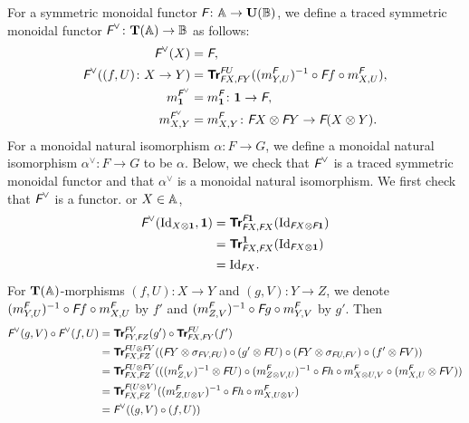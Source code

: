 For a symmetric monoidal functor $\textit{\textsf{F}} \colon \mathbb{A} \to
\mathbf{U}(\mathbb{B})$, we define a traced symmetric monoidal functor
$\textit{\textsf{F}}^{\vee} \colon \mathbf T(\mathbb{A}) \to \mathbb{B}$ as follows:
\begin{align*}
  \textit{\textsf{F}}^{\vee}(X) &= \textit{\textsf{F}}, \\
  \textit{\textsf{F}}^{\vee}((f,U) \colon X \to Y)
  &= {\normalfont\textsf{\textbf{Tr}}}^{\textit{\textsf{F}}U}_{\textit{\textsf{F}}X,\textit{\textsf{F}}Y}((m_{Y,U}^{\textit{\textsf{F}}})^{-1} \circ \textit{\textsf{F}}f
  \circ m^{\textit{\textsf{F}}}_{X,U}), \\
  m^{\textit{\textsf{F}}^{\vee}}_{\mathbf 1} &= m^{\textit{\textsf{F}}}_{\mathbf 1} \colon \mathbf 1 \to \textit{\textsf{F}}, \\
  m^{\textit{\textsf{F}}^{\vee}}_{X,Y} &= m^{\textit{\textsf{F}}}_{X,Y} \colon \textit{\textsf{F}}X \otimes \textit{\textsf{F}}Y
  \to \textit{\textsf{F}}(X \otimes Y).
\end{align*}
For a monoidal natural isomorphism $\alpha \colon F \to G$, we
define a monoidal natural isomorphism $\alpha^{\vee} \colon F \to G$
to be $\alpha$. Below, we check that $\textit{\textsf{F}}^{\vee}$ is a
traced symmetric monoidal functor and that $\alpha^{\vee}$ is a
monoidal natural isomorphism. We first check that $\textit{\textsf{F}}^{\vee}$
is a functor. or $X \in \mathbb{A}$,
\begin{align*}
  \textit{\textsf{F}}^{\vee}(\mbox{Id}_{X \otimes \mathbf 1},\mathbf 1)
  &= {\normalfont\textsf{\textbf{Tr}}}^{\textit{\textsf{F}}\mathbf 1}_{\textit{\textsf{F}}X,\textit{\textsf{F}}X}(\mbox{Id}_{\textit{\textsf{F}}X \otimes \textit{\textsf{F}}\mathbf 1}) \\
  &= {\normalfont\textsf{\textbf{Tr}}}^{\mathbf 1}_{\textit{\textsf{F}}X,\textit{\textsf{F}}X}(\mbox{Id}_{\textit{\textsf{F}}X \otimes \mathbf 1}) \\
  &= \mbox{Id}_{\textit{\textsf{F}}X}.
\end{align*}
For $\mathbf T(\mathbb{A})$-morphisms $(f,U) \colon X \to Y$ and $(g,V)
\colon Y \to Z$, we denote $(m_{Y,U}^{\textit{\textsf{F}}})^{-1} \circ
\textit{\textsf{F}}f \circ m^{\textit{\textsf{F}}}_{X,U}$ by $f'$ and
$(m_{Z,V}^{\textit{\textsf{F}}})^{-1} \circ \textit{\textsf{F}}g \circ
m^{\textit{\textsf{F}}}_{Y,V}$ by $g'$. Then
\begin{align*}
  \textit{\textsf{F}}^{\vee}(g,V) \circ \textit{\textsf{F}}^{\vee}(f,U)
  &= {\normalfont\textsf{\textbf{Tr}}}^{\textit{\textsf{F}}V}_{\textit{\textsf{F}}Y,\textit{\textsf{F}}Z}(g') \circ
  {\normalfont\textsf{\textbf{Tr}}}^{\textit{\textsf{F}}U}_{\textit{\textsf{F}}X,\textit{\textsf{F}}Y}(f') \\
  &= {\normalfont\textsf{\textbf{Tr}}}^{\textit{\textsf{F}}U \otimes \textit{\textsf{F}}V}_{\textit{\textsf{F}}X,\textit{\textsf{F}}Z}
  ((\textit{\textsf{F}}Y \otimes \sigma_{\textit{\textsf{F}}V,\textit{\textsf{F}}U}) \circ
  (g' \otimes \textit{\textsf{F}}U) \circ (\textit{\textsf{F}}Y \otimes \sigma_{\textit{\textsf{F}}U,\textit{\textsf{F}}V}) \circ
  (f' \otimes \textit{\textsf{F}}V)) \\
  &= {\normalfont\textsf{\textbf{Tr}}}^{\textit{\textsf{F}}U \otimes \textit{\textsf{F}}V}_{\textit{\textsf{F}}X,\textit{\textsf{F}}Z}(((m_{Z,V}^{\textit{\textsf{F}}})^{-1}
  \otimes \textit{\textsf{F}}U) \circ
  (m_{Z \otimes V,U}^{\textit{\textsf{F}}})^{-1} \circ
  \textit{\textsf{F}}h \circ m_{X \otimes U,V}^{\textit{\textsf{F}}} \circ (m_{X,U}^{\textit{\textsf{F}}} \otimes \textit{\textsf{F}}V)) \\
  &= {\normalfont\textsf{\textbf{Tr}}}^{\textit{\textsf{F}}(U \otimes V)}_{\textit{\textsf{F}}X,\textit{\textsf{F}}Z}((m_{Z,U \otimes V}^{\textit{\textsf{F}}})^{-1} \circ
  \textit{\textsf{F}}h \circ m_{X, U \otimes V}^{\textit{\textsf{F}}}) \\
  &= \textit{\textsf{F}}^{\vee}((g,V) \circ (f,U))
\end{align*}
